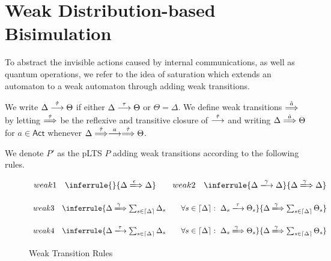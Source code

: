 \documentclass[runningheads]{llncs}
\newcommand{\Act}{\ensuremath{\mathsf{Act}}\xspace}
\begin{document}
\section{Weak Distribution-based Bisimulation}
\label{sec:weak}
To abstract the invisible actions caused by internal communications, as well as quantum operations, we refer to the idea of saturation which extends an automaton to a weak automaton through adding weak transitions.

We write $\Delta \mathrel{\stackrel{\hat{\tau}}{\longrightarrow}} \Theta$ if either $\Delta \mathrel{\stackrel{\tau}{\longrightarrow}} \Theta$ or $\Theta = \Delta$.
We define weak transitions $\mathrel{\stackrel{\hat{a}}{\Longrightarrow}}$ by letting $\mathrel{\stackrel{\hat{\tau}}{\Longrightarrow}}$ be the reflexive and transitive closure of $\mathrel{\stackrel{\hat{\tau}}{\longrightarrow}}$ and writing $\Delta\mathrel{\stackrel{\hat{a}}{\Longrightarrow}} \Theta$ for $a \in\Act$ whenever $\Delta \mathrel{\stackrel{\hat{\tau}}{\Longrightarrow}} \mathrel{\stackrel{a}{\longrightarrow}} \mathrel{\stackrel{\hat{\tau}}{\Longrightarrow}} \Theta$.

We denote $P'$ as the pLTS $P$ adding weak transitions according to the following rules.

\begin{figure}[H]
    \centering
    $\begin{array}{lrllrllr}
        weak1 &  \inferrule
            {  }
            {\Delta\xLongrightarrow{\epsilon}\Delta}
        && weak2 &  \inferrule
            {\Delta\xlongrightarrow{\gamma}\Delta}
            {\Delta\xLongrightarrow{\gamma}\Delta}
    \end{array}$
    \smallskip
    
    $\begin{array}{lr}
      weak3 &  \inferrule
            {\Delta\xLongrightarrow{\gamma}\sum\nolimits_{s\in\lceil\Delta\rceil}\Delta_{s}\quad\quad\forall s\in\lceil\Delta\rceil:~\Delta_{s}\xlongrightarrow{\tau}\Theta_{s}}
            {\Delta\xLongrightarrow{\gamma}\sum\nolimits_{s\in\lceil\Delta\rceil}\Theta_{s}}
    \end{array}$
    \smallskip
    
    $\begin{array}{lr}
      weak4 & \inferrule
            {\Delta\xlongrightarrow{\tau}\sum\nolimits_{s\in\lceil\Delta\rceil}\Delta_{s}\quad\quad\forall s\in\lceil\Delta\rceil:~\Delta_{s}\xLongrightarrow{\gamma}\Theta_{s}}
            {\Delta\xLongrightarrow{\gamma}\sum\nolimits_{s\in\lceil\Delta\rceil}\Theta_{s}}
    \end{array}$
    \caption{Weak Transition Rules}
    \label{fig:weak_trans}
\end{figure}
\end{document}

